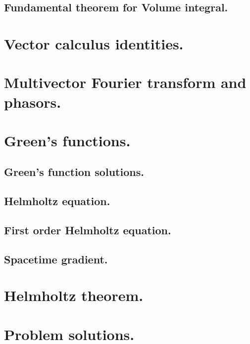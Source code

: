       \subsection{Fundamental theorem for Volume integral.}
         
   \section{Vector calculus identities.}
      
   \section{Multivector Fourier transform and phasors.}
      
   \section{Green's functions.}
      
      \subsection{Green's function solutions.}
         
      \subsection{Helmholtz equation.}
         
      \subsection{First order Helmholtz equation.}
         
      \subsection{Spacetime gradient.}
         
   \section{Helmholtz theorem.}
      
      
   \section{Problem solutions.}
      \shipoutAnswer
